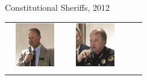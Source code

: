 \begin{frame}{Constitutional Sheriffs, 2012}
\begin{table}[h]
\begin{tabular}{cccc}
    \includegraphics[width=0.75\textwidth,height=.24\textheight,keepaspectratio=true]{img/s7.png} &
    \includegraphics[width=0.75\textwidth,height=.24\textheight,keepaspectratio=true]{img/s8.png} \\
    &

\end{tabular}
\end{table}
\end{frame}
